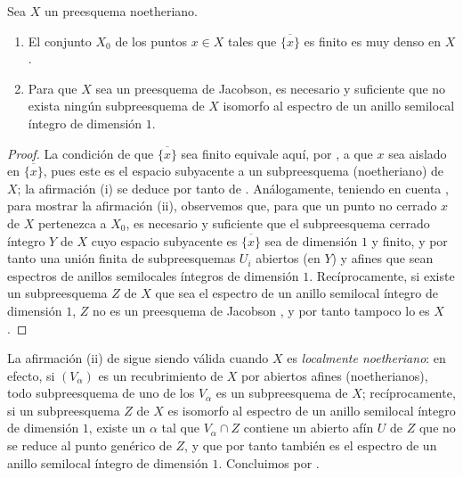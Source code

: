 \begin{proposition}[10.5.5]
\label{IV.10.5.5}
Sea $X$ un preesquema noetheriano.
\begin{enumerate}[label=\textup{(\roman*)}]
  \item El conjunto $X_0$ de los puntos $x\in X$ tales que $\overline{\{x\}}$ es finito es muy denso en $X$.
  \item Para que $X$ sea un preesquema de Jacobson, es necesario y suficiente que no exista ningún subpreesquema de $X$ isomorfo al espectro de un anillo semilocal íntegro de dimensión $1$.
\end{enumerate}
\end{proposition}

\begin{proof}
La condición de que $\overline{\{x\}}$ sea finito equivale aquí, por , a que $x$ sea aislado en $\overline{\{x\}}$, pues este es el espacio subyacente a un subpreesquema (noetheriano) de $X$; la afirmación (i) se deduce por tanto de .
Análogamente, teniendo en cuenta , para mostrar la afirmación (ii), observemos que, para que un punto no cerrado $x$ de $X$ pertenezca a $X_0$, es necesario y suficiente que el subpreesquema cerrado íntegro $Y$ de $X$ cuyo espacio subyacente es $\overline{\{x\}}$ sea de dimensión $1$ y finito, y por tanto una unión finita de subpreesquemas $U_i$ abiertos (en $Y$) y afines que sean espectros de anillos semilocales íntegros de dimensión $1$.
Recíprocamente, si existe un subpreesquema $Z$ de $X$ que sea el espectro de un anillo semilocal íntegro de dimensión $1$, $Z$ no es un preesquema de Jacobson , y por tanto tampoco lo es $X$ .
\end{proof}


\begin{remark}[10.5.6]
\label{IV.10.5.6}
La afirmación (ii) de  sigue siendo válida cuando $X$ es \emph{localmente noetheriano}: en efecto, si $(V_\alpha)$ es un recubrimiento de $X$ por abiertos afines (noetherianos), todo subpreesquema de uno de los $V_\alpha$ es un subpreesquema de $X$; recíprocamente, si un subpreesquema $Z$ de $X$ es isomorfo al espectro de un anillo semilocal íntegro de dimensión $1$, existe un $\alpha$ tal que $V_\alpha\cap Z$ contiene un abierto afín $U$ de $Z$ que no se reduce al punto genérico de $Z$, y que por tanto también es el espectro de un anillo semilocal íntegro de dimensión $1$.
Concluimos por .
\end{remark}

